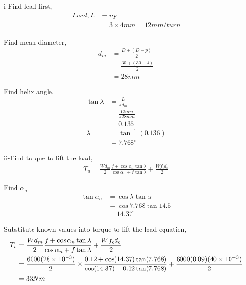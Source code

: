 \documentclass[a4paper, fleqn]{article}
\providecommand{\sci}[1]{\protect\ensuremath{\times 10^{\StrSubstitute[0]{#1}{e}{}}}}
\begin{document}
i-Find lead first,
\begin{equation*}
    \begin{aligned}
    Lead, L &=np\\
    &=3\times4mm = 12mm/turn    
    \end{aligned}
\end{equation*}

Find mean diameter,
\begin{equation*}
    \begin{aligned}
    d_m &= \frac {D+(D-p)}{2}\\  
    &= \frac {30+(30-4)}{2}\\ 
    &= 28mm
    \end{aligned}
\end{equation*}

Find helix angle,
\begin{equation*}
    \begin{aligned}
    \tan\lambda &= \frac{L}{\pi d_m}\\
    &= \frac{12mm}{\pi 28mm} \\
    &=0.136\\
    \lambda &= \tan^{-1}(0.136)\\
    &=7.768^{\circ}
    \end{aligned}
\end{equation*}

ii-Find torque to lift the load,
\begin{equation*}
    \begin{aligned}
    T_u = \frac{Wd_m}{2} \frac{f+\cos\alpha_n \tan\lambda}{\cos\alpha_n + f\tan\lambda} + \frac{Wf_c d_c}{2}
    \end{aligned}
\end{equation*}

Find $\alpha_n$
\begin{equation*}
    \begin{aligned}
    \tan \alpha_n &= \cos \lambda \tan \alpha\\
     &= \cos 7.768 \tan 14.5\\
    &= 14.37^{\circ}
    \end{aligned}
\end{equation*}

Substitute known values into torque to lift the load equation,
\begin{equation*}
    \begin{aligned}
    T_u &= \frac{Wd_m}{2} \frac{f+\cos\alpha_n \tan\lambda}{\cos\alpha_n + f\tan\lambda} + \frac{Wf_c d_c}{2} \\
    &= \frac{6000(28\sci{e-3})}{2} \times\frac{0.12+\cos(14.37) \tan(7.768)}{\cos(14.37) - 0.12\tan(7.768)} + \frac{6000(0.09)(40\sci{e-3})}{2} \\
    &= 33 Nm
    \end{aligned}
\end{equation*}
\end{document}

